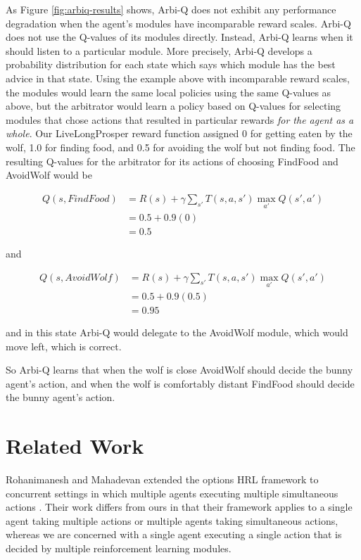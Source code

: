 As Figure \ref{fig:arbiq-results} shows, Arbi-Q does not exhibit any performance degradation when the agent's modules have incomparable reward scales. Arbi-Q does not use the Q-values of its modules directly. Instead, Arbi-Q learns when it should listen to a particular module. More precisely, Arbi-Q develops a probability distribution for each state which says which module has the best advice in that state. Using the example above with incomparable reward scales, the modules would learn the same local policies using the same Q-values as above, but the arbitrator would learn a policy based on Q-values for selecting modules that chose actions that resulted in particular rewards {\it for the agent as a whole}. Our LiveLongProsper reward function assigned 0 for getting eaten by the wolf, 1.0 for finding food, and 0.5 for avoiding the wolf but not finding food. The resulting Q-values for the arbitrator for its actions of choosing FindFood and AvoidWolf would be

\begin{align*}
Q(s, FindFood) &= R(s) + \gamma \sum_{s'} T(s, a, s') \max_{a'} Q(s', a')\\
               &= 0.5 + 0.9 (0)\\
               &= 0.5
\end{align*}

and

\begin{align*}
Q(s, AvoidWolf) &= R(s) + \gamma \sum_{s'} T(s, a, s') \max_{a'} Q(s', a')\\
                &= 0.5 + 0.9 (0.5)\\
                &= 0.95
\end{align*}

and in this state Arbi-Q would delegate to the AvoidWolf module, which would move left, which is correct.

So Arbi-Q learns that when the wolf is close AvoidWolf should decide the bunny agent's action, and when the wolf is comfortably distant FindFood should decide the bunny agent's action.

\section{Related Work}

Rohanimanesh and Mahadevan extended the options HRL framework to concurrent settings in which multiple agents executing multiple simultaneous actions \cite{rohanimanesh2001decision,rohanimanesh2002learning}. Their work differs from ours in that their framework applies to a single agent taking multiple actions or multiple agents taking simultaneous actions, whereas we are concerned with a single agent executing a single action that is decided by multiple reinforcement learning modules.

